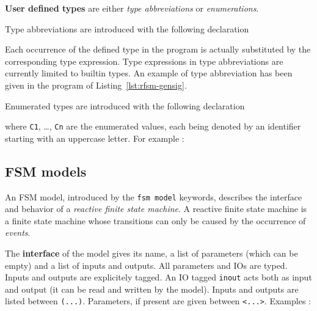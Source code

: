 \medskip
\textbf{User defined types} are either \emph{type abbreviations} or \emph{enumerations}.

\step Type abbreviations are introduced with the following declaration
\begin{center}
\end{center}
Each occurrence of the defined type in the program is actually substituted by the corresponding type
expression. Type expressions in type abbreviations are currently limited to builtin types.
An example of type abbreviation has been given in the program of Listing~\ref{lst:rfsm-gensig}. 

\medskip
\step Enumerated types  are introduced with the following declaration
\begin{center}
\end{center}
where \verb|C1|, \ldots, \verb|Cn| are the enumerated values, each being denoted by an identifier
starting with an uppercase letter. For example : 
\begin{center}
\end{center}


\subsection{FSM models}
\label{sec:fsm-models}

An FSM model, introduced by the \verb|fsm model| keywords, describes the interface and behavior of a
\emph{reactive finite state machine}. A reactive finite state machine is a finite state machine
whose transitions can only be caused by the occurrence of \emph{events}.

\begin{center}
\end{center}

\medskip
The \textbf{interface} of the model gives its name, a list of parameters (which can be empty) and a
list of inputs and outputs. All parameters and IOs are typed. Inputs and outputs are explicitely
tagged. An IO tagged \verb|inout| acts both as input and output (it can be read and written by the
model). Inputs and outputs are listed between \verb|(...)|. Parameters, if present are given between
\verb|<...>|. Examples :

